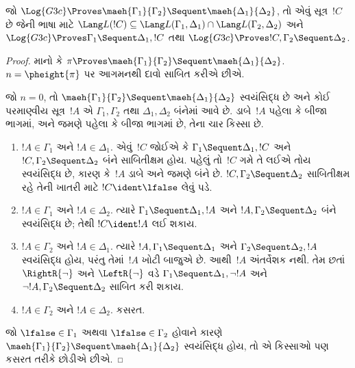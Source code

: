 \begin{lem}[માએહારાનું ઉપપ્રમેય]
જો $\Log{G3c}
\Proves \maeh{\Gamma_1}{\Gamma_2} \Sequent \maeh{\Delta_1}{\Delta_2}$,
તો એવું સૂત્ર~$!C$ છે
જેની ભાષા માટે
$\Lang L(!C)
\subseteq \Lang L(\Gamma_1,
\Delta_1) \cap \Lang L(\Gamma_2, \Delta_2)$
અને
$\Log{G3c} \Proves \Gamma_1 \Sequent \Delta_1, !C$
તથા
$\Log{G3c} \Proves !C,
\Gamma_2 \Sequent \Delta_2$.
\end{lem}

\begin{proof}
  માનો કે $\pi \Proves \maeh{\Gamma_1}{\Gamma_2} \Sequent
  \maeh{\Delta_1}{\Delta_2}$.
  $n=\pheight{\pi}$ પર આગમનથી
  દાવો સાબિત કરીએ છીએ.

  જો $n=0$, તો
  $\maeh{\Gamma_1}{\Gamma_2} \Sequent
  \maeh{\Delta_1}{\Delta_2}$
  સ્વયંસિદ્ધ છે અને કોઈ પરમાણ્વીય
  સૂત્ર~$!A$ એ
  $\Gamma_1, \Gamma_2$ તથા
  $\Delta_1, \Delta_2$ બંનેમાં આવે છે.
  ડાબે~$!A$ પહેલા કે બીજા ભાગમાં,
  અને જમણે પહેલા કે બીજા ભાગમાં છે,
  તેના ચાર કિસ્સા છે.
  \begin{enumerate}
    \item $!A \in \Gamma_1$ અને $!A \in \Delta_1$.
    એવું~$!C$ જોઈએ કે
    $\Gamma_1 \Sequent \Delta_1, !C$ અને
    $!C, \Gamma_2 \Sequent \Delta_2$
    બંને સાબિતીક્ષમ હોય.
    પહેલું તો~$!C$ ગમે તે લઈએ
    તોય સ્વયંસિદ્ધ છે, કારણ કે~$!A$
    ડાબે અને જમણે બંને છે.
    $!C, \Gamma_2 \Sequent \Delta_2$
    સાબિતીક્ષમ રહે તેની ખાતરી માટે
    $!C \ident \lfalse$ લેવું પડે.
    \item $!A \in \Gamma_1$ અને
    $!A \in \Delta_2$. ત્યારે
    $\Gamma_1 \Sequent \Delta_1, !A$
    અને $!A, \Gamma_2 \Sequent \Delta_2$
    બંને સ્વયંસિદ્ધ છે; તેથી
    $!C \ident !A$ લઈ શકાય.
    \item $!A \in \Gamma_2$ અને
    $!A \in \Delta_1$. ત્યારે
    $!A, \Gamma_1 \Sequent \Delta_1$
    અને $\Gamma_2 \Sequent \Delta_2, !A$
    સ્વયંસિદ્ધ હોય, પરંતુ તેમાં~$!A$
    ખોટી બાજુએ છે. આથી~$!A$
    અંતર્વેશક નથી. તેમ છતાં
    $\RightR{\lnot}$ અને
    $\LeftR{\lnot}$ વડે
    $\Gamma_1 \Sequent \Delta_1, \lnot!A$
    અને $\lnot !A, \Gamma_2 \Sequent \Delta_2$
    સાબિત કરી શકાય.
    \item $!A \in \Gamma_2$ અને
    $!A \in \Delta_2$. કસરત.
  \end{enumerate}
  જો $\lfalse \in \Gamma_1$
  અથવા $\lfalse \in \Gamma_2$
  હોવાને કારણે
  $\maeh{\Gamma_1}{\Gamma_2} \Sequent
  \maeh{\Delta_1}{\Delta_2}$
  સ્વયંસિદ્ધ હોય, તો એ કિસ્સાઓ
  પણ કસરત તરીકે છોડીએ છીએ.


\end{proof}
